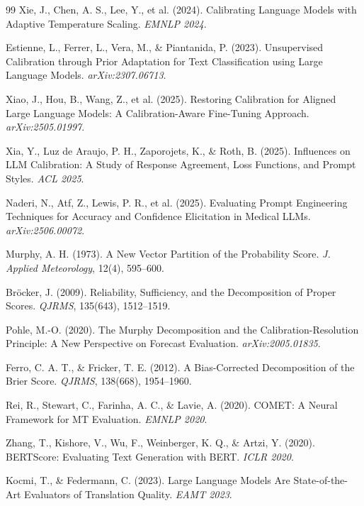 \documentclass[11pt,a4paper,oneside]{article}
\begin{document}
\begin{thebibliography}{99}
 Xie, J., Chen, A. S., Lee, Y., et al. (2024). Calibrating Language Models with Adaptive Temperature Scaling. \textit{EMNLP 2024}.

 Estienne, L., Ferrer, L., Vera, M., \& Piantanida, P. (2023). Unsupervised Calibration through Prior Adaptation for Text Classification using Large Language Models. \textit{arXiv:2307.06713}.

 Xiao, J., Hou, B., Wang, Z., et al. (2025). Restoring Calibration for Aligned Large Language Models: A Calibration-Aware Fine-Tuning Approach. \textit{arXiv:2505.01997}.

 Xia, Y., Luz de Araujo, P. H., Zaporojets, K., \& Roth, B. (2025). Influences on LLM Calibration: A Study of Response Agreement, Loss Functions, and Prompt Styles. \textit{ACL 2025}.

 Naderi, N., Atf, Z., Lewis, P. R., et al. (2025). Evaluating Prompt Engineering Techniques for Accuracy and Confidence Elicitation in Medical LLMs. \textit{arXiv:2506.00072}.

 Murphy, A. H. (1973). A New Vector Partition of the Probability Score. \textit{J. Applied Meteorology}, 12(4), 595--600.

 Bröcker, J. (2009). Reliability, Sufficiency, and the Decomposition of Proper Scores. \textit{QJRMS}, 135(643), 1512--1519.

 Pohle, M.-O. (2020). The Murphy Decomposition and the Calibration-Resolution Principle: A New Perspective on Forecast Evaluation. \textit{arXiv:2005.01835}.

 Ferro, C. A. T., \& Fricker, T. E. (2012). A Bias-Corrected Decomposition of the Brier Score. \textit{QJRMS}, 138(668), 1954--1960.

 Rei, R., Stewart, C., Farinha, A. C., \& Lavie, A. (2020). COMET: A Neural Framework for MT Evaluation. \textit{EMNLP 2020}.

 Zhang, T., Kishore, V., Wu, F., Weinberger, K. Q., \& Artzi, Y. (2020). BERTScore: Evaluating Text Generation with BERT. \textit{ICLR 2020}.

 Kocmi, T., \& Federmann, C. (2023). Large Language Models Are State-of-the-Art Evaluators of Translation Quality. \textit{EAMT 2023}.


\end{thebibliography}
\end{document}
